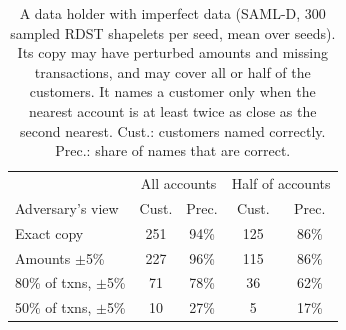 \begin{table}[t]
\caption{A data holder with imperfect data (SAML-D, 300 sampled RDST shapelets per seed, mean over seeds). Its copy may have perturbed amounts and missing transactions, and may cover all or half of the customers. It names a customer only when the nearest account is at least twice as close as the second nearest. Cust.: customers named correctly. Prec.: share of names that are correct.}
\label{tab:real}
\small\setlength{\tabcolsep}{3pt}
\centering
\begin{tabular}{lcccc}
\toprule
& \multicolumn{2}{c}{All accounts} & \multicolumn{2}{c}{Half of accounts} \\
Adversary's view & Cust. & Prec. & Cust. & Prec. \\
\midrule
Exact copy & 251 & 94\% & 125 & 86\% \\
Amounts $\pm$5\% & 227 & 96\% & 115 & 86\% \\
80\% of txns, $\pm$5\% & 71 & 78\% & 36 & 62\% \\
50\% of txns, $\pm$5\% & 10 & 27\% & 5 & 17\% \\
\bottomrule\end{tabular}\end{table}
